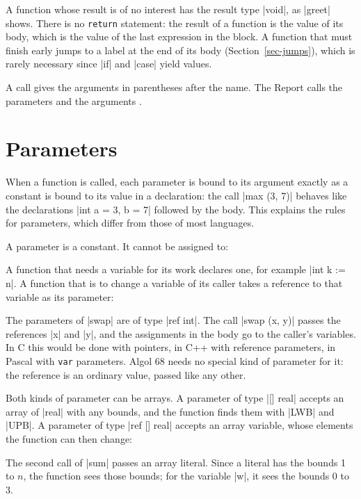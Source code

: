 A function whose result is of no interest has the result type
\code|void|, as \code|greet| shows. There is no \texttt{return}
statement: the result of a function is the value of its body, which is
the value of the last expression in the block. A function that must
finish early jumps to a label at the end of its body (Section~\ref{sec-jumps}),
which is rarely necessary since \code|if| and \code|case| yield values.

A call gives the arguments in parentheses after the name. The Report
calls the parameters  and the arguments
.

\section{Parameters}\label{sec-params}

When a function is called, each parameter is bound to its argument
exactly as a constant is bound to its value in a declaration: the call
\code|max (3, 7)| behaves like the declarations \code|int a = 3, b = 7|
followed by the body. This explains the rules for parameters, which differ
from those of most languages.

A parameter is a constant. It cannot be assigned to:


A function that needs a variable for its work declares one, for example
\code|int k := n|. A function that is to change a variable of its caller
takes a reference to that variable as its parameter:


The parameters of \code|swap| are of type \code|ref int|. The call
\code|swap (x, y)| passes the references \code|x| and \code|y|, and the
assignments in the body go to the caller's variables. In C this would be
done with pointers, in C++ with reference parameters, in Pascal with
\texttt{var} parameters. Algol 68 needs no special kind of parameter for
it: the reference is an ordinary value, passed like any other.

Both kinds of parameter can be arrays. A parameter of type \code|[] real|
accepts an array of \code|real| with any bounds, and the function finds
them with \code|LWB| and \code|UPB|. A parameter of type \code|ref [] real|
accepts an array variable, whose elements the function can then change:


The second call of \code|sum| passes an array literal. Since a literal
has the bounds 1 to $n$, the function sees those bounds; for the variable
\code|w|, it sees the bounds 0 to 3.

